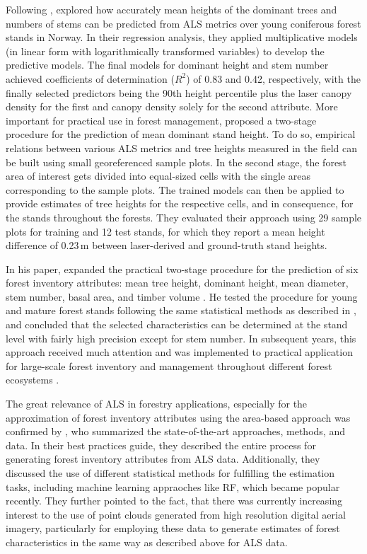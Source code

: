  Following \textcite{Means.2000}, \textcite{Nsset.2001} explored how accurately mean heights of the dominant trees and 
 numbers of stems can be predicted from \ac{ALS} metrics over young coniferous forest stands in Norway. 
In their regression analysis, they applied multiplicative models (in linear form with logarithmically transformed variables)
to develop the predictive models. The final models for dominant height and stem number achieved coefficients of determination ($R^2$) of 0.83 
and 0.42, respectively, with the finally selected predictors being the 90th height percentile plus the laser canopy density for the first and 
 canopy density solely for the second attribute. 
More important for practical use in forest management, \textcite{Nsset.2001} proposed a two-stage procedure for the prediction of 
mean dominant stand height. To do so, empirical relations between various \ac{ALS} metrics and tree heights measured in the field can be built
using small georeferenced sample plots. In the second stage, 
the forest area of interest gets divided into equal-sized cells with the single areas corresponding to the sample plots. 
The trained models can then be applied to provide estimates of tree heights for the respective cells,
and in consequence, for the stands throughout the forests. 
They evaluated their approach using 29 sample plots for training and 12 test stands, 
for which they report a mean height difference of 0.23\,m between
laser-derived and ground-truth stand heights. 

In his \citeyear{Nsset.2002} paper, \citeauthor{Nsset.2002} expanded the practical two-stage procedure for the prediction of six
forest inventory attributes: mean tree height, dominant height, mean diameter, stem number, basal area, and timber volume \parencite{Nsset.2002}.
He tested the procedure for young and mature forest stands following the same statistical methods as described in \textcite{Nsset.2001},
and concluded that the selected characteristics can be determined at the stand level with fairly high precision except for stem number.  
In subsequent years, this approach received much attention and was implemented to practical application
for large-scale forest inventory and management 
throughout different forest ecosystems \parencite{Nsset.2004b,Nsset.2004c,Hudak.2006,Li.2008,Hyyppa.2008,Woods.2011}.

The great relevance of \ac{ALS} in forestry applications, especially for the approximation of forest inventory attributes using the area-based approach
was confirmed by \textcite{White.2013}, who summarized the state-of-the-art approaches, methods, and data. In their best practices guide, 
they described the entire process for generating forest inventory attributes from \ac{ALS} data. 
Additionally, they discussed the use of different statistical methods for fulfilling the estimation tasks, 
including machine learning appraoches like \ac{RF}, which became popular recently. 
They further pointed to the fact, that there was currently increasing interest to the use of point clouds generated from high resolution 
digital aerial imagery, particularly for employing these data to generate estimates of forest characteristics in the same way as described above
for \ac{ALS} data.
 
